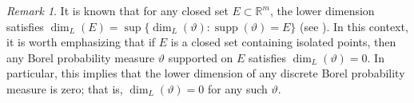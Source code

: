 \documentclass{amsproc}
\newtheorem{theorem}{Theorem}[section]
\theoremstyle{definition}
\theoremstyle{remark}
\newtheorem{remark}[theorem]{Remark}
\numberwithin{equation}{section}
\begin{document}





   
\begin{remark}\label{rem24}
   It is known that for any closed set \( E \subset \mathbb{R}^m \), the lower dimension satisfies $\dim_L(E) = \sup\{ \dim_L(\vartheta) : \operatorname{supp}(\vartheta) = E \}$ (see \cite[Theorem 4.1.3]{Fraser}). In this context, it is worth emphasizing that if \( E \) is a closed set containing isolated points, then any Borel probability measure \( \vartheta \) supported on \( E \) satisfies \( \dim_L(\vartheta) = 0 \). In particular, this implies that the lower dimension of any discrete Borel probability measure is zero; that is, \( \dim_L(\vartheta) = 0 \) for any such \( \vartheta \).
 \end{remark}
\end{document}
